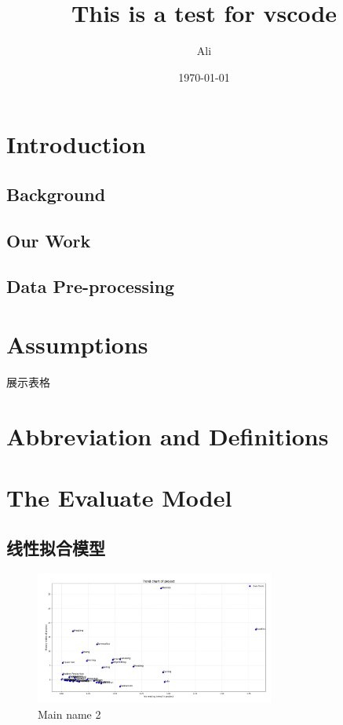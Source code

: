 \documentclass[a4paper]{article}
\title{ This is a test for vscode}
\author{ Ali}
\date{\today}
\begin{document}
    \maketitle
\begin{abstract}
    \lipsum[150]
\end{abstract}
\tableofcontents
\section{Introduction}
\subsection{Background}
\subsection{Our Work}
\subsection{Data Pre-processing}


\section{Assumptions}

展示表格

\section{Abbreviation and Definitions}
\section{The Evaluate Model}
\subsection{线性拟合模型}
\begin{figure}[H] %
    \centering %
    \includegraphics[width=0.7\textwidth]{TrendChartOfProject} %
    \caption{Main name 2} %
    \label{Fig.main2} %
    \end{figure}
\end{document}
